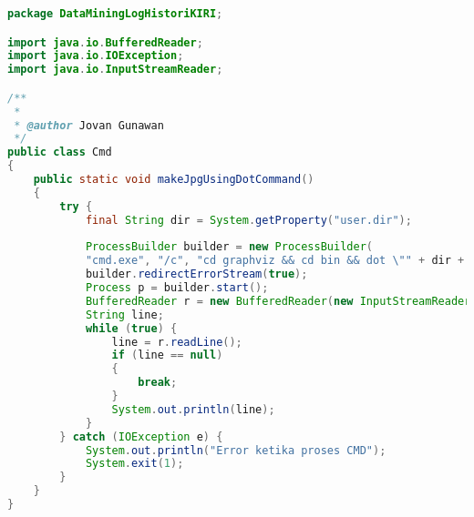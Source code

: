 \begin{lstlisting}[language=Java,basicstyle=\tiny,caption=CMD.java]
package DataMiningLogHistoriKIRI;

import java.io.BufferedReader;
import java.io.IOException;
import java.io.InputStreamReader;

/**
 *
 * @author Jovan Gunawan
 */
public class Cmd 
{
    public static void makeJpgUsingDotCommand()
    {
        try {
            final String dir = System.getProperty("user.dir");
            
            ProcessBuilder builder = new ProcessBuilder(
            "cmd.exe", "/c", "cd graphviz && cd bin && dot \"" + dir + "\\tree.txt\" -o \"" + dir + "\\tree.jpg\" -Tjpg ");
            builder.redirectErrorStream(true);
            Process p = builder.start();
            BufferedReader r = new BufferedReader(new InputStreamReader(p.getInputStream()));
            String line;
            while (true) {
                line = r.readLine();
                if (line == null) 
                { 
                    break; 
                }
                System.out.println(line);
            }
        } catch (IOException e) {
            System.out.println("Error ketika proses CMD");
            System.exit(1);
        }
    }
}
\end{lstlisting}